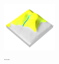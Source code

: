 \documentclass[prodmode,acmtochi]{acmsmall} %
\begin{document}
\begin{figure}[h!]
\begin{center}
		\includegraphics[width=0.24\textwidth]{images/render_3d/mean_depth_3.png}
	\caption{...}
	\label{fig:}
\end{center}
\end{figure}

\end{document}
